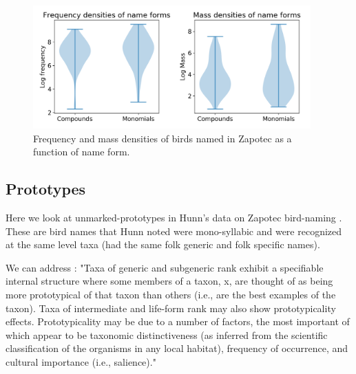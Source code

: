 \documentclass[10pt,letterpaper]{article}
\begin{document}
\begin{figure}[ht!]
  \begin{center}
    \includegraphics[width=0.95\textwidth]{./figures/nameforms-both.png}
        \caption{Frequency and mass densities of birds named in Zapotec as a function of name form.}
        \label{fig-both-nameforms}
  \end{center}
\end{figure}

\subsection{Prototypes}

Here we look at unmarked-prototypes in Hunn's data on Zapotec bird-naming  \cite{hunn2008zapotec}. These are bird names that Hunn noted were mono-syllabic and were recognized at the same level taxa (had the same folk generic and folk specific names).


We can address \cite{berlin2014ethnobiological}:
 "Taxa of generic and subgeneric rank exhibit a specifiable internal
structure where some members of a taxon, x, are thought of as being
more prototypical of that taxon than others (i.e., are the best
examples of the taxon). Taxa of intermediate and life-form rank may
also show prototypicality effects. Prototypicality may be due to a
number of factors, the most important of which appear to be taxonomic
distinctiveness (as inferred from the scientific classification of the
organisms in any local habitat), frequency of occurrence, and cultural
importance (i.e., salience)."

\end{document}
